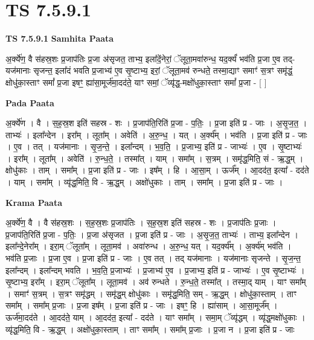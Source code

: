 \documentclass[17pt]{extarticle}
\begin{document}
\section{ TS 7.5.9.1 }

\textbf{TS 7.5.9.1 } \newline
\textbf{Samhita Paata} \newline

अ॒र्क्ये॑ण॒ वै स॑हस्र॒शः प्र॒जाप॑तिः प्र॒जा अ॑सृजत॒ ताभ्य॒ इला᳚दें॒नेरां॒ ॅलूता॒मवा॑रुन्ध॒ यद॒र्क्यं॑ भव॑ति प्र॒जा ए॒व तद्-यज॑मानाः सृजन्त॒ इला᳚दं भवति प्र॒जाभ्य॑ ए॒व सृ॒ष्टाभ्य॒ इरां॒ ॅलूता॒मव॑ रुन्धते॒ तस्मा॒द्याꣳ समाꣳ॑ स॒त्रꣳ समृ॑द्धं॒ क्षोधु॑का॒स्ताꣳ समां᳚ प्र॒जा इषꣳ॒॒ ह्या॑सा॒मूर्ज॑मा॒दद॑ते॒ याꣳ समां॒ ॅव्यृ॑द्ध॒-मक्षो॑धुका॒स्ताꣳ समां᳚ प्र॒जा - [  ] \newline

\textbf{Pada Paata} \newline

अ॒र्क्ये॑ण । वै । स॒ह॒स्र॒श इति॑ सहस्र - शः । प्र॒जाप॑ति॒रिति॑ प्र॒जा - प॒तिः॒ । प्र॒जा इति॑ प्र - जाः । अ॒सृ॒ज॒त॒ । ताभ्यः॑ । इला᳚न्देन । इरा᳚म् । लूता᳚म् । अवेति॑ । अ॒रु॒न्ध॒ । यत् । अ॒र्क्य᳚म् । भव॑ति । प्र॒जा इति॑ प्र - जाः । ए॒व । तत् । यज॑मानाः । सृ॒ज॒न्ते॒ । इला᳚न्दम् । भ॒व॒ति॒ । प्र॒जाभ्य॒ इति॑ प्र - जाभ्यः॑ । ए॒व । सृ॒ष्टाभ्यः॑ । इरा᳚म् । लूता᳚म् । अवेति॑ । रु॒न्ध॒ते॒ । तस्मा᳚त् । याम् । समा᳚म् । स॒त्रम् । समृ॑द्ध॒मिति॒ सं - ऋ॒द्ध॒म् । क्षोधु॑काः । ताम् । समा᳚म् । प्र॒जा इति॑ प्र - जाः । इष᳚म् । हि । आ॒सा॒म् । ऊर्ज᳚म् । आ॒दद॑त॒ इत्या᳚ - दद॑ते । याम् । समा᳚म् । व्यृ॑द्ध॒मिति॒ वि - ऋ॒द्ध॒म् । अक्षो॑धुकाः । ताम् । समा᳚म् । प्र॒जा इति॑ प्र - जाः ।  \newline


\textbf{Krama Paata} \newline

अ॒र्क्ये॑ण॒ वै । वै स॑हस्र॒शः । स॒ह॒स्र॒शः प्र॒जाप॑तिः । स॒ह॒स्र॒श इति॑ सहस्र - शः । प्र॒जाप॑तिः प्र॒जाः । प्र॒जाप॑ति॒रिति॑ प्र॒जा - प॒तिः॒ । प्र॒जा अ॑सृजत । प्र॒जा इति॑ प्र - जाः । अ॒सृ॒ज॒त॒ ताभ्यः॑ । ताभ्य॒ इला᳚न्देन । इला᳚न्दे॒नेरा᳚म् । इरा॒म् ॅलूता᳚म् । लूता॒मव॑ । अवा॑रुन्ध । अ॒रु॒न्ध॒ यत् । यद॒र्क्य᳚म् । अ॒र्क्य॑म् भव॑ति । भव॑ति प्र॒जाः । प्र॒जा ए॒व । प्र॒जा इति॑ प्र - जाः । ए॒व तत् । तद् यज॑मानाः । यज॑मानाः सृजन्ते । सृ॒ज॒न्त॒ इला᳚न्दम् । इला᳚न्दम् भवति । भ॒व॒ति॒ प्र॒जाभ्यः॑ । प्र॒जाभ्य॑ ए॒व । प्र॒जाभ्य॒ इति॑ प्र - जाभ्यः॑ । ए॒व सृ॒ष्टाभ्यः॑ । सृ॒ष्टाभ्य॒ इरा᳚म् । इरा॒म् ॅलूता᳚म् । लूता॒मव॑ । अव॑ रुन्धते । रु॒न्ध॒ते॒ तस्मा᳚त् । तस्मा॒द् याम् । याꣳ समा᳚म् । समाꣳ॑ स॒त्रम् । स॒त्रꣳ समृ॑द्धम् । समृ॑द्ध॒म् क्षोधु॑काः । समृ॑द्ध॒मिति॒ सम् - ऋ॒द्ध॒म् । क्षोधु॑का॒स्ताम् । ताꣳ समा᳚म् । समा᳚म् प्र॒जाः । प्र॒जा इष᳚म् । प्र॒जा इति॑ प्र - जाः । इषꣳ॒॒ हि । ह्या॑साम् । आ॒सा॒मूर्ज᳚म् । ऊर्ज॑मा॒दद॑ते । आ॒दद॑ते॒ याम् । आ॒दद॑त॒ इत्या᳚ - दद॑ते । याꣳ समा᳚म् । समा॒म् ॅव्यृ॑द्धम् । व्यृ॑द्ध॒मक्षो॑धुकाः । व्यृ॑द्ध॒मिति॒ वि - ऋ॒द्ध॒म् । अक्षो॑धुका॒स्ताम् । ताꣳ समा᳚म् । समा᳚म् प्र॒जाः । प्र॒जा न । प्र॒जा इति॑ प्र - जाः \newline
\end{document}
